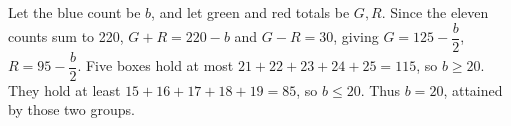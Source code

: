 Let the blue count be $b$, and let green and red totals be $G,R$. Since the eleven counts sum to 220, $G+R=220-b$ and $G-R=30$, giving $G=125-\dfrac{b}{2}$, $R=95-\dfrac{b}{2}$. Five boxes hold at most $21+22+23+24+25=115$, so $b\ge20$. They hold at least $15+16+17+18+19=85$, so $b\le20$. Thus $\boxed{b=20}$, attained by those two groups.
